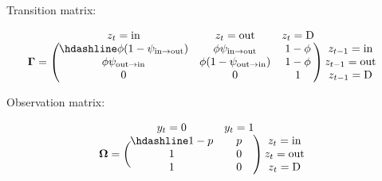 \documentclass[
  12pt,
]{krantz}
\begin{document}
Transition matrix:

\[
\begin{matrix}
& \\
\mathbf{\Gamma} =
    \left ( \vphantom{ \begin{matrix} 12 \\ 12 \\ 12 \end{matrix} } \right .
\end{matrix}
\hspace{-1.2em}
\begin{matrix}
    z_t=\text{in} & z_t=\text{out} & z_t=\text{D} \\ \hdashline
\phi (1-\psi_{\text{in} \rightarrow \text{out}}) & \phi \psi_{\text{in} \rightarrow \text{out}} & 1 - \phi\\
\phi \psi_{\text{out} \rightarrow \text{in}} & \phi (1-\psi_{\text{out} \rightarrow \text{in}}) & 1 - \phi\\
0 & 0 & 1
\end{matrix}
\hspace{-0.2em}
\begin{matrix}
& \\
\left . \vphantom{ \begin{matrix} 12 \\ 12 \\ 12 \end{matrix} } \right )
    \begin{matrix}
    z_{t-1}=\text{in} \\ z_{t-1}=\text{out} \\ z_{t-1}=\text{D}
    \end{matrix}
\end{matrix}
\]

Observation matrix:

\[
\begin{matrix}
& \\
\mathbf{\Omega} =
    \left ( \vphantom{ \begin{matrix} 12 \\ 12 \end{matrix} } \right .
\end{matrix}
\hspace{-1.2em}
\begin{matrix}
    y_t=0 & y_t=1 \\ \hdashline
1 - p & p\\
1 & 0\\
1 & 0
\end{matrix}
\hspace{-0.2em}
\begin{matrix}
& \\
\left . \vphantom{ \begin{matrix} 12 \\ 12 \\ 12 \end{matrix} } \right )
    \begin{matrix}
    z_{t}=\text{in} \\ z_{t}=\text{out} \\ z_{t}=\text{D}
    \end{matrix}
\end{matrix}
\]
\end{document}
